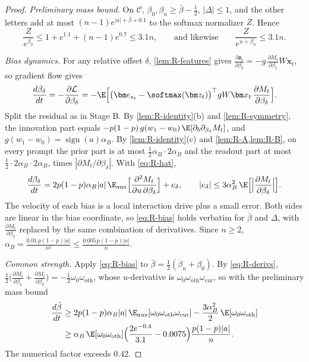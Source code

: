 \begin{proof}
\emph{Preliminary mass bound.} On $\mathcal C$, $\beta_0,\beta_n\ge\bar\beta-\tfrac12$, $|\Delta|\le1$, and the other letters add at most
$(n-1)e^{|a|+\bar\beta+0.1}$ to the softmax normalizer $Z$. Hence
\[
 \frac{Z}{e^{\beta_0}}\le1+e^{1.1}+(n-1)e^{0.7}\le3.1n,
 \qquad\text{and likewise}\qquad
 \frac{Z}{e^{u+\beta_n}}\le3.1n .
\]

\emph{Bias dynamics.} For any relative offset $\delta$, \cref{lem:R-features} gives
$\tfrac{\partial\bm z_t}{\partial\beta_\delta}=-g\,\tfrac{\partial M_t}{\partial\beta_\delta}W\bm x_t$, so gradient flow gives
\[
 \frac{d\beta_\delta}{dt}=-\frac{\partial\mathcal L}{\partial\beta_\delta}
 =-\E\Bigl[\bigl(\bm e_{s_t}-\softmax(\bm z_t)\bigr)^\top gW\bm x_t\,\frac{\partial M_t}{\partial\beta_\delta}\Bigr].
\]
Split the residual as in Stage B. By \cref{lem:R-identity}(b) and \cref{lem:R-symmetry}, the innovation part equals
$-p(1-p)\,g(w_1-w_0)\,\E[\partial_b\partial_{\beta_\delta}M_t]$, and $g(w_1-w_0)=\operatorname{sign}(a)\alpha_B$. By \cref{lem:R-identity}(c) and
\cref{lem:R-A,lem:R-B}, on every prompt the prior part is at most $\tfrac12\alpha_B\cdot2\alpha_B$ and the readout part at most
$\tfrac12\cdot2\alpha_B\cdot2\alpha_B$, times $|\partial M_t/\partial\beta_\delta|$. With \cref{eq:R-hat},
\begin{equation}
 \frac{d\beta_\delta}{dt}=2p(1-p)\alpha_B|a|\,\E_{\mathrm{aux}}\Bigl[\frac{\partial^2M_t}{\partial u\,\partial\beta_\delta}\Bigr]+e_\delta,
 \qquad
 |e_\delta|\le3\alpha_B^2\,\E\Bigl[\Bigl|\frac{\partial M_t}{\partial\beta_\delta}\Bigr|\Bigr].
 \label{eq:R-bias}
\end{equation}
The velocity of each bias is a local interaction drive plus a small error. Both sides are linear in the bias coordinate, so
\cref{eq:R-bias} holds verbatim for $\bar\beta$ and $\Delta$, with $\tfrac{\partial M_t}{\partial\beta_\delta}$ replaced by the same
combination of derivatives. Since $n\ge2$, $\alpha_B=\tfrac{0.01\,p(1-p)|a|}{n^2}\le\tfrac{0.005\,p(1-p)|a|}{n}$.

\emph{Common strength.} Apply \cref{eq:R-bias} to $\bar\beta=\tfrac12(\beta_n+\beta_0)$. By \cref{eq:R-derivs},
$\tfrac12\bigl(\tfrac{\partial M_t}{\partial\beta_n}+\tfrac{\partial M_t}{\partial\beta_0}\bigr)=-\tfrac12\omega_0\omega_{\mathrm{oth}}$, whose $u$-derivative is
$\omega_0\omega_{\mathrm{oth}}\omega_{\mathrm{cur}}$, so with the preliminary mass bound
\begin{align*}
 \frac{d\bar\beta}{dt}&\ge2p(1-p)\alpha_B|a|\,\E_{\mathrm{aux}}[\omega_0\omega_{\mathrm{oth}}\omega_{\mathrm{cur}}]-\frac{3\alpha_B^2}{2}\,\E[\omega_0\omega_{\mathrm{oth}}]\\
 &\ge\alpha_B\,\E[\omega_0\omega_{\mathrm{oth}}]\Bigl(\frac{2e^{-0.4}}{3.1}-0.0075\Bigr)\frac{p(1-p)|a|}{n}.
\end{align*}
The numerical factor exceeds $0.42$.


\end{proof}
